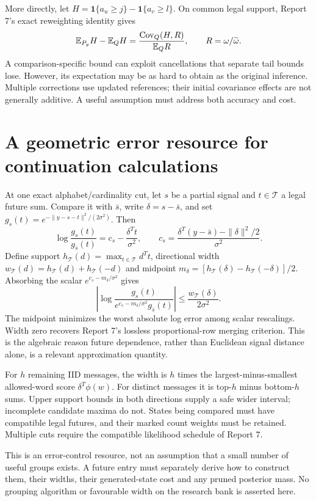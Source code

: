 \documentclass[10pt,a4paper]{article}
\newcommand{\E}{\mathbb E}
\newcommand{\ind}{\mathbf 1}
\begin{document}
More directly, let $H=\ind\{a_u\geq j\}-\ind\{a_v\geq l\}$. On common legal support, Report 7's exact
reweighting identity gives
\[
 \E_{P_y}H-\E_QH=\frac{\Cov_Q(H,R)}{\E_QR},\qquad R=\omega/\widetilde\omega.
\]
A comparison-specific bound can exploit cancellations that separate tail bounds lose. However, its expectation
may be as hard to obtain as the original inference. Multiple corrections use updated references; their
initial covariance effects are not generally additive. A useful assumption must address both accuracy and cost.

\section{A geometric error resource for continuation calculations}
\label{sec:width-foundation}
At one exact alphabet/cardinality cut, let $s$ be a partial signal and $t\in\mathcal T$ a legal future sum.
Compare it with $\bar s$, write $\delta=s-\bar s$, and set $g_s(t)=e^{-\|y-s-t\|^2/(2\sigma^2)}$. Then
\[
 \log\frac{g_s(t)}{g_{\bar s}(t)}
 =c_s-\frac{\delta^Tt}{\sigma^2},\qquad
 c_s=\frac{\delta^T(y-\bar s)-\|\delta\|^2/2}{\sigma^2}.
\]
Define support $h_{\mathcal T}(d)=\max_{t\in\mathcal T}d^Tt$, directional width
$w_{\mathcal T}(d)=h_{\mathcal T}(d)+h_{\mathcal T}(-d)$ and midpoint
$m_\delta=[h_{\mathcal T}(\delta)-h_{\mathcal T}(-\delta)]/2$. Absorbing the scalar
$e^{c_s-m_\delta/\sigma^2}$ gives
\begin{equation}
 \left|\log\frac{g_s(t)}{e^{c_s-m_\delta/\sigma^2}g_{\bar s}(t)}\right|
 \leq\frac{w_{\mathcal T}(\delta)}{2\sigma^2}.
 \label{eq:width}
\end{equation}
The midpoint minimizes the worst absolute log error among scalar rescalings. Width zero recovers Report 7's
lossless proportional-row merging criterion. This is the algebraic reason future dependence, rather than
Euclidean signal distance alone, is a relevant approximation quantity.

For $h$ remaining IID messages, the width is $h$ times the largest-minus-smallest allowed-word score
$\delta^T\phi(w)$. For distinct messages it is top-$h$ minus bottom-$h$ sums. Upper support bounds in both
directions supply a safe wider interval; incomplete candidate maxima do not. States being compared must
have compatible legal futures, and their marked count weights must be retained. Multiple cuts require the
compatible likelihood schedule of Report 7.

This is an error-control resource, not an assumption that a small number of useful groups exists. A future
entry must separately derive how to construct them, their widths, their generated-state cost and any pruned
posterior mass. No grouping algorithm or favourable width on the research bank is asserted here.
\end{document}
